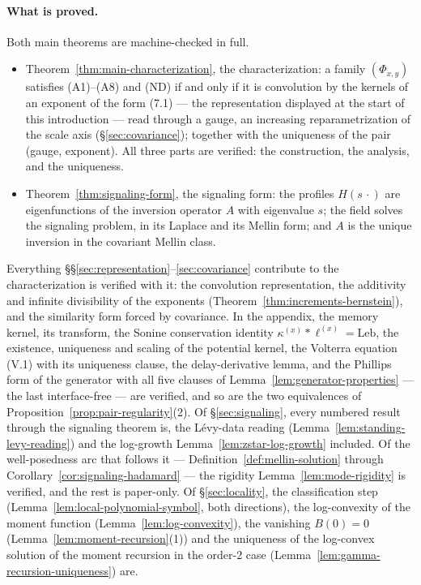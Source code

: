 \paragraph{What is proved.} Both main theorems are machine-checked in full.
\begin{itemize}
\item Theorem~\ref{thm:main-characterization}, the characterization: a family
$(\Phi_{x,y})$ satisfies (A1)--(A8) and (ND) if and only if it is convolution by the kernels
of an exponent of the form (7.1) --- the representation displayed at the start of this
introduction --- read through a gauge, an increasing reparametrization of the scale axis
(\S\ref{sec:covariance}); together with the uniqueness of the pair (gauge, exponent). All three parts are verified: the construction, the analysis,
and the uniqueness.
\item Theorem~\ref{thm:signaling-form}, the signaling form: the profiles $H(s\,\cdot)$ are
eigenfunctions of the inversion operator $A$ with eigenvalue $s$; the field solves the
signaling problem, in its Laplace and its Mellin form; and $A$ is the unique inversion in
the covariant Mellin class.
\end{itemize}

Everything \S\S\ref{sec:representation}--\ref{sec:covariance} contribute to the
characterization is verified with it: the convolution representation, the additivity and
infinite divisibility of the exponents (Theorem~\ref{thm:increments-bernstein}), and the
similarity form forced by covariance. In the appendix, the memory kernel, its transform, the
Sonine conservation identity $\kappa^{(x)} * \ell^{(x)} = \mathrm{Leb}$, the existence,
uniqueness and scaling of the potential kernel, the Volterra equation (V.1) with its
uniqueness clause, the delay-derivative lemma, and the Phillips form of the generator with
all five clauses of Lemma~\ref{lem:generator-properties} --- the last interface-free ---
are verified, and so are the two equivalences of
Proposition~\ref{prop:pair-regularity}(2). Of \S\ref{sec:signaling}, every
numbered result through the signaling theorem is, the L\'evy-data reading
(Lemma~\ref{lem:standing-levy-reading}) and the log-growth
Lemma~\ref{lem:zstar-log-growth} included. Of the well-posedness arc that follows it
--- Definition~\ref{def:mellin-solution} through
Corollary~\ref{cor:signaling-hadamard} --- the rigidity Lemma~\ref{lem:mode-rigidity} is
verified, and the rest is paper-only. Of \S\ref{sec:locality}, the classification step
(Lemma~\ref{lem:local-polynomial-symbol}, both directions), the log-convexity of the moment
function (Lemma~\ref{lem:log-convexity}), the vanishing $B(0) = 0$
(Lemma~\ref{lem:moment-recursion}(1)) and the uniqueness of the log-convex solution of the
moment recursion in the order-2 case (Lemma~\ref{lem:gamma-recursion-uniqueness}) are.

